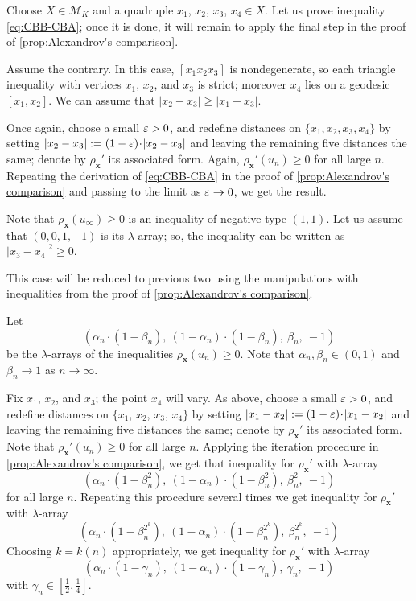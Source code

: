 \documentclass[a4paper,10pt]{article}
\begin{document}
Choose $X\in \mathcal{M}_K$ and a quadruple $x_1$, $x_2$, $x_3$, $x_4\in X$.
Let us prove inequality \ref{eq:CBB-CBA};
once it is done, it will remain to apply the final step in the proof of \ref{prop:Alexandrov's comparison}.

Assume the contrary.
In this case, $[x_1x_2x_3]$ is nondegenerate, so each triangle inequality with vertices $x_1$, $x_2$, and $x_3$ is strict; moreover $x_4$ lies on a geodesic $[x_1,x_2]$.
We can assume that $|x_2-x_3|\ge |x_1-x_3|$.

Once again, choose a small $\varepsilon>0$, and redefine distances on $\{x_1,x_2,x_3,x_4\}$ by setting $|x_2-x_3|:=(1-\eps)\cdot|x_2-x_3|$ and leaving the remaining five distances the same; denote by $\rho_{\bm{x}}'$ its associated form.
Again, $\rho_{\bm{x}}'(u_n)\ge0$ for all large $n$.
Repeating the derivation of \ref{eq:CBB-CBA} in the proof of \ref{prop:Alexandrov's comparison} and passing to the limit as $\varepsilon\to 0$, we get the result.

Note that $\rho_{\bm{x}}(u_\infty)\ge0$ is an inequality of negative type $(1,1)$.
Let us assume that $(0,0, 1,-1)$ is its $\lambda$-array;
so, the inequality can be written as $|x_3-x_4|^2\ge 0$.

This case will be reduced to previous two using the manipulations with inequalities from the proof of \ref{prop:Alexandrov's comparison}.

Let
\[(\alpha_n\cdot (1-\beta_n),\  (1-\alpha_n)\cdot(1-\beta_n),\  \beta_n,\ -1)\]
be the $\lambda$-arrays of the inequalities $\rho_{\bm{x}}(u_n)\ge 0$.
Note that $\alpha_n,\beta_n\in(0,1)$ and $\beta_n\to 1$ as $n\to\infty$.

Fix $x_1$, $x_2$, and $x_3$; the point $x_4$ will vary.
As above, choose a small $\varepsilon>0$, and redefine distances on $\{x_1$, $x_2$, $x_3$, $x_4\}$ by setting $|x_1-x_2|\z{\mathrel{:=}}(1-\eps)\cdot|x_1-x_2|$ and leaving the remaining five distances the same; denote by $\rho_{\bm{x}}'$ its associated form.
Note that $\rho_{\bm{x}}'(u_n)\ge0$ for all large $n$.
Applying the iteration procedure in \ref{prop:Alexandrov's comparison}, we get that inequality for $\rho_{\bm{x}}'$ with $\lambda$-array
\[(\alpha_n\cdot (1-\beta_n^2),\  (1-\alpha_n)\cdot(1-\beta_n^2),\  \beta_n^2,\ -1)\]
for all large $n$.
Repeating this procedure several times we get inequality for $\rho_{\bm{x}}'$ with $\lambda$-array
\[(\alpha_n\cdot (1-\beta_n^{2^k}),\  (1-\alpha_n)\cdot(1-\beta_n^{2^k}),\  \beta_n^{2^k},\ -1)\]
Choosing $k=k(n)$ appropriately, we get inequality for $\rho_{\bm{x}}'$ with $\lambda$-array
\[(\alpha_n\cdot (1-\gamma_n),\  (1-\alpha_n)\cdot(1-\gamma_n),\  \gamma_n,\ -1)\]
with $\gamma_n\in[\tfrac12,\tfrac14]$.
\end{document}
